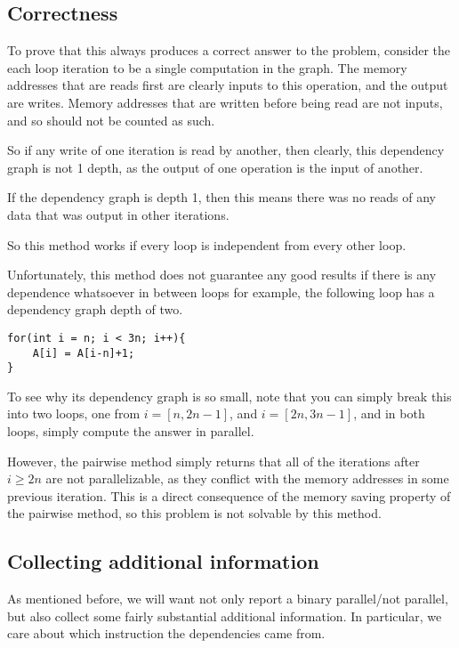 \documentclass[12pt,twoside]{reedthesis}
\begin{document}
		\subsection{Correctness}
		
		To prove that this always produces a correct answer to the problem, consider the each loop iteration to be a single computation in the graph. The memory addresses that are reads first are clearly inputs to this operation, and the output are writes. Memory addresses that are written before being read are not inputs, and so should not be counted as such. 
		
		So if any write of one iteration is read by another, then clearly, this dependency graph is not 1 depth, as the output of one operation is the input of another. 
		
		If the dependency graph is depth 1, then this means there was no reads of any data that was output in other iterations. 
		
		So this method works if every loop is independent from every other loop. 
		
		Unfortunately, this method does not guarantee any good results if there is any dependence whatsoever in between loops for example, the following loop has a dependency graph depth of two. 
		
\begin{lstlisting}
for(int i = n; i < 3n; i++){
	A[i] = A[i-n]+1;
}
\end{lstlisting}

		To see why its dependency graph is so small, note that you can simply break this into two loops, one from $i = [n,2n-1]$, and $i=[2n,3n-1]$, and in both loops, simply compute the answer in parallel. 

		However, the pairwise method simply returns that all of the iterations after $i \ge 2n$ are not parallelizable, as they conflict with the memory addresses in some previous iteration. This is a direct consequence of the memory saving property of the pairwise method, so this problem is not solvable by this method.  
	
		\subsection{Collecting additional information}
		
		As mentioned before, we will want not only report a binary parallel/not parallel, but also collect some fairly substantial additional information. In particular, we care about which instruction the dependencies came from. 
		
\end{document}
